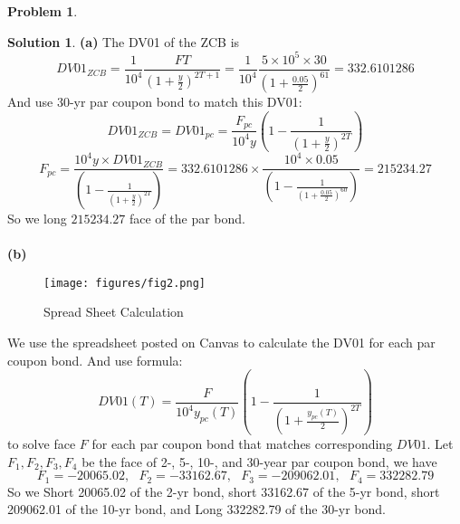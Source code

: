 \documentclass[a4paper, 10pt]{article}
\theoremstyle{definition}
\newtheorem{problem}{Problem}
\theoremstyle{hSol}
\newtheorem*{solution}{Solution}
\begin{document}
\begin{problem} 
\end{problem}
\begin{solution} 
\textbf{(a)} The DV01 of the ZCB is
\begin{equation}
  DV01_{ZCB} = \frac{1}{10^4}\frac{FT}{(1+\frac{y}{2})^{2T+1}} = \frac{1}{10^4}\frac{5\times10^5\times 30}{(1+\frac{0.05}{2})^{61}} = 332.6101286
\end{equation}
And use 30-yr par coupon bond to match this DV01:
$$
DV01_{ZCB} = DV01_{pc} = \frac{F_{pc}}{10^4 y} \left(1-\frac{1}{(1+\frac{y}{2})^{2T}}\right)
$$
$$
F_{pc} = \frac{10^4 y\times DV01_{ZCB}}{(1-\frac{1}{(1+\frac{y}{2})^{2T}})} = 332.6101286\times  \frac{10^4 \times 0.05}{(1-\frac{1}{(1+\frac{0.05}{2})^{60}})} = 215234.27
$$
So we long $215234.27$ face of the par bond.\\
~\\
\textbf{(b)}
\begin{figure}[H]
  \centering
  \captionsetup{justification=centering}
  \caption{\label{fig:span}Spread Sheet Calculation}
  \vspace{-10pt}
  \texttt{[image: figures/fig2.png]}
\end{figure}
We use the spreadsheet posted on Canvas to calculate the DV01 for each par coupon bond. And use formula:
$$
DV01(T) = \frac{F}{10^4 y_{pc}(T)} \left(1-\frac{1}{(1+\frac{y_{pc}(T)}{2})^{2T}}\right)
$$
to solve face $F$ for each par coupon bond that matches corresponding $DV01$. Let $F_1, F_2, F_3, F_4$ be the face of 2-, 5-, 10-, and 30-year par coupon bond, we have
$$
F_1 = -20065.02,~~~F_2=-33162.67,~~~F_3= -209062.01,~~~F_4=332282.79
$$
So we Short 20065.02 of the 2-yr bond, short 33162.67 of the 5-yr bond, short 209062.01 of the 10-yr bond, and Long 332282.79 of the 30-yr bond.
\end{solution}
\end{document}
